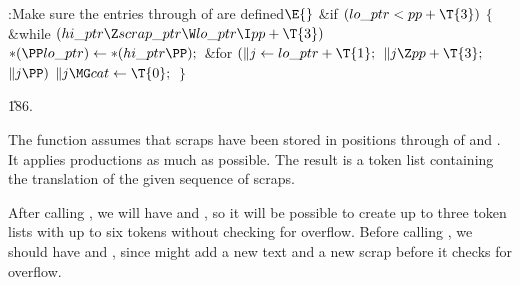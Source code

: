 \Y\B\4:Make sure the entries  through  of %
 are defined\X${}\E{}$\6
\&{if} ${}(\\{lo\_ptr}<\\{pp}+\T{3}){}$\5
${}\{{}$\1\6
\&{while} ${}(\\{hi\_ptr}\Z\\{scrap\_ptr}\W\\{lo\_ptr}\I\\{pp}+\T{3}){}$\1\5
${}{*}(\PP\\{lo\_ptr})\K{*}(\\{hi\_ptr}\PP);{}$\2\6
\&{for} ${}(\|j\K\\{lo\_ptr}+\T{1};{}$ ${}\|j\Z\\{pp}+\T{3};{}$ ${}\|j\PP){}$\1%
\5
${}\|j\MG\\{cat}\K\T{0};{}$\2\6
\4${}\}{}$\2\par
\U186.\fi

The  function assumes that scraps have been stored in
positions  through  of  and %
. It
applies productions as much as
possible. The result is a token list containing the translation of
the given sequence of scraps.

After calling , we will have  and
, so it will be possible to create up
to three token
lists with up to six tokens without checking for overflow. Before calling
, we should have  and %
,
since  might add a new text and a new scrap before it checks
for overflow.

